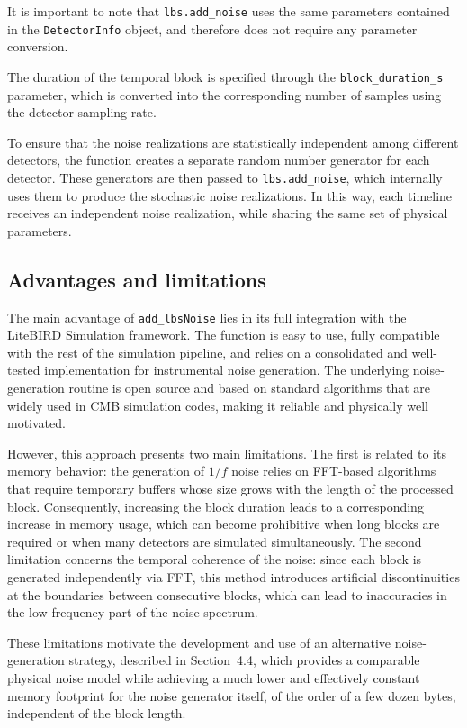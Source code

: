 It is important to note that \texttt{lbs.add\_noise} uses the same parameters contained in the \texttt{DetectorInfo} object, and therefore does not require any parameter conversion.

The duration of the temporal block is specified through the \texttt{block\_duration\_s} parameter, which is converted into the corresponding number of samples using the detector sampling rate.

To ensure that the noise realizations are statistically independent among different detectors, the function creates a separate random number generator for each detector. These generators are then passed to \texttt{lbs.add\_noise}, which internally uses them to produce the stochastic noise realizations. In this way, each timeline receives an independent noise realization, while sharing the same set of physical parameters.



\subsection{Advantages and limitations}

The main advantage of \texttt{add\_lbsNoise} lies in its full integration with the LiteBIRD Simulation framework. The function is easy to use, fully compatible with the rest of the simulation pipeline, and relies on a consolidated and well-tested implementation for instrumental noise generation. The underlying noise-generation routine is open source and based on standard algorithms that are widely used in CMB simulation codes, making it reliable and physically well motivated.

However, this approach presents two main limitations. The first is related to its memory behavior: the generation of $1/f$ noise relies on FFT-based algorithms that require temporary buffers whose size grows with the length of the processed block. Consequently, increasing the block duration leads to a corresponding increase in memory usage, which can become prohibitive when long blocks are required or when many detectors are simulated simultaneously. The second limitation concerns the temporal coherence of the noise: since each block is generated independently via FFT, this method introduces artificial discontinuities at the boundaries between consecutive blocks, which can lead to inaccuracies in the low-frequency part of the noise spectrum.

These limitations motivate the development and use of an alternative noise-generation strategy, described in Section~4.4, which provides a comparable physical noise model while achieving a much lower and effectively constant memory footprint for the noise generator itself, of the order of a few dozen bytes, independent of the block length.




